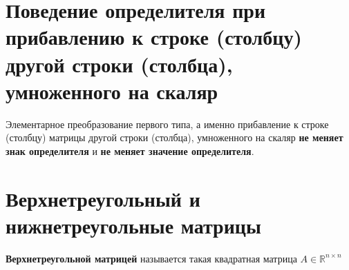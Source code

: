 \documentclass[a4paper,11pt]{report}
\begin{document}
\section{Поведение определителя при прибавлению к строке (столбцу) другой строки (столбца), умноженного на скаляр}
Элементарное преобразование первого типа, а именно прибавление к строке (столбцу) матрицы другой строки
(столбца), умноженного на скаляр
\textbf{не меняет знак определителя} и \textbf{не меняет значение определителя}.
\section{Верхнетреугольный и нижнетреугольные матрицы}
\textbf{Верхнетреугольной матрицей} называется такая квадратная матрица $A \in \mathbb{R}^{n\times{n}}$
\end{document}
